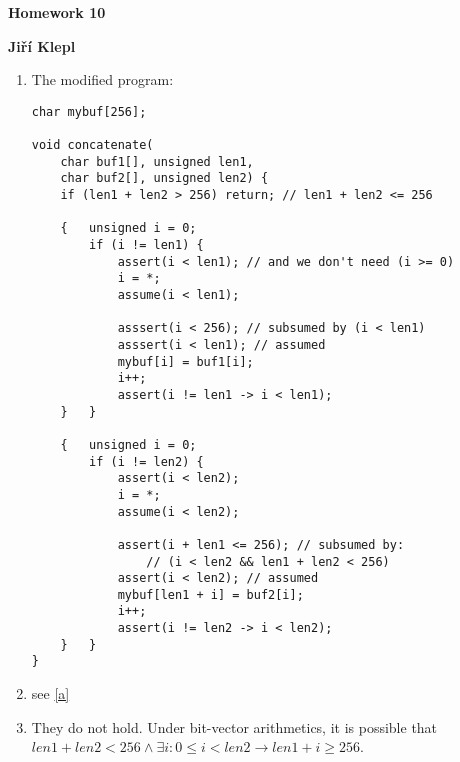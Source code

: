 \documentclass[a4paper,12pt]{article} %
\begin{document}
\begin{center}
    {\Large \bf Homework 10}
    \vspace{2mm}

    {\bf Jiří Klepl}

\end{center}

\vspace{0.4cm}

\begin{enumerate}[label=\alph*)]
    \item \label{a} The modified program:
    \begin{lstlisting}
char mybuf[256];

void concatenate(
    char buf1[], unsigned len1,
    char buf2[], unsigned len2) {
    if (len1 + len2 > 256) return; // len1 + len2 <= 256

    {   unsigned i = 0;
        if (i != len1) {
            assert(i < len1); // and we don't need (i >= 0)
            i = *;
            assume(i < len1);

            asssert(i < 256); // subsumed by (i < len1)
            asssert(i < len1); // assumed
            mybuf[i] = buf1[i];
            i++;
            assert(i != len1 -> i < len1);
    }   }

    {   unsigned i = 0;
        if (i != len2) {
            assert(i < len2);
            i = *;
            assume(i < len2);

            assert(i + len1 <= 256); // subsumed by:
                // (i < len2 && len1 + len2 < 256)
            assert(i < len2); // assumed
            mybuf[len1 + i] = buf2[i];
            i++;
            assert(i != len2 -> i < len2);
    }   }
}
    \end{lstlisting}
    \item see \ref{a}
    \item They do not hold. Under bit-vector arithmetics, it is possible that $len1 + len2 < 256 \land \exists i: 0 \leq i < len2 \to len1 + i \geq 256$.
\end{enumerate}
\end{document}
